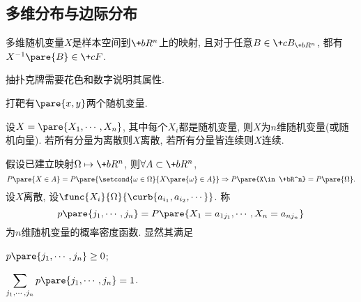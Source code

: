 \documentclass{ctexart}
\begin{document}


\subsection{多维分布与边际分布} %
\label{sub:多维分布与边际分布}

多维随机变量$X$是样本空间到$\+bR^n$上的映射, 且对于任意$B\in \+cB_{\+bR^n}$, 都有$X^{-1}\pare{B}\in \+cF$.
\begin{ex}
    抽扑克牌需要花色和数字说明其属性.
\end{ex}
\begin{ex}
    打靶有$\pare{x,y}$两个随机变量.
\end{ex}
设$X=\pare{X_1,\cdots, X_n}$, 其中每个$X_i$都是随机变量, 则$X$为$n$维随机变量(或随机向量). 若所有分量为离散则$X$离散, 若所有分量皆连续则$X$连续.
\par
假设已建立映射$\Omega\mapsto \+bR^n$, 则$\forall A \subset \+bR^n$,
\[ P\pare{X\in A} = P\pare{\setcond{\omega \in \Omega}{X\pare{\omega}\in A}} \Rightarrow P\pare{X\in \+bR^n} = P\pare{\Omega}. \]
设$X$离散, 设$\func{X_i}{\Omega}{\curb{a_{i_1}, a_{i_2}, \cdots}}$. 称
\[ p\pare{j_1,\cdots,j_n} = P\pare{X_1 = a_{1j_1},\cdots, X_n = a_{nj_n}} \]
为$n$维随机变量的概率密度函数. 显然其满足
\begin{cenum}
    \item $p\pare{j_1,\cdots,j_n} \ge 0$;
    \item $\displaystyle \sum_{j_1,\cdots,j_n} p\pare{j_1,\cdots, j_n} = 1$.
\end{cenum}
\end{document}
